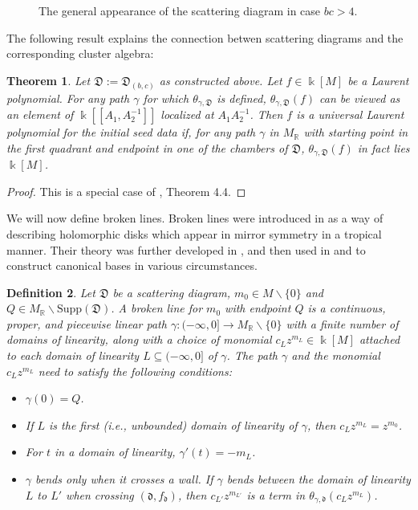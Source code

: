 \documentclass[12pt]{amsart}
\newtheorem{theorem}{Theorem}[section]
\newtheorem{defn}[theorem]{Definition}
\theoremstyle{remark}
\newcommand{\RR}{\mathbb{R}}
\newcommand{\dd}{\mathfrak{d}}
\newcommand{\DD}{\mathfrak{D}}
\begin{document}
\begin{figure}

\caption{The general appearance of the scattering diagram in case $bc>4$.}
\label{diagram33}
\end{figure}

The following result explains the connection betwen scattering diagrams
and the corresponding cluster algebra:

\begin{theorem}
\label{univLaurent}
Let $\DD:=\DD_{(b,c)}$ as constructed above.
Let $f \in \Bbbk[M]$ be a Laurent polynomial. For any path
$\gamma$ for which $\theta_{\gamma,\DD}$ is defined, $\theta_{\gamma,\DD}(f)$
can be viewed as an element of $\Bbbk[[A_1,A_2^{-1}]]$ localized at 
$A_1A_2^{-1}$. Then $f$ is a universal Laurent polynomial for the initial
seed data if, for any path $\gamma$ in $M_{\RR}$ with starting
point in the first quadrant and endpoint in one of the chambers of
$\DD$, $\theta_{\gamma,\DD}(f)$ in fact lies $\Bbbk[M]$.
\end{theorem}

\begin{proof}
This is a special case of \cite{GHKK}, Theorem 4.4.
\end{proof}

We will now define broken lines. Broken lines were introduced in 
\cite{G10} as a way of describing holomorphic disks which appear in
mirror symmetry in a tropical manner. Their theory was further developed
in \cite{CPS}, and then used in \cite{GHK11} and \cite{GHKK} to construct
canonical bases in various circumstances.

\begin{defn} \label{brokendef}
Let $\DD$ be a scattering diagram, $m_0 \in M \backslash \{0\}$ and $Q \in M_{\RR} \backslash \text{Supp}(\DD)$. A broken line for $m_0$ with endpoint $Q$ is a
continuous, proper, and  piecewise linear path $\gamma : ( - \infty , 0] 
\rightarrow M_{\mathbb{R}} \backslash \{ 0\} $ with a finite number of domains 
of linearity, along with a choice of
monomial $c_L z^{m_L} \in \Bbbk[M]$ attached to each domain of linearity $L \subseteq ( - \infty, 0]$ of $\gamma$. The path $\gamma$ and the monomial $c_L z^{m_L}$ need to satisfy the following conditions:
\begin{itemize}
    \item $\gamma(0) = Q$.
    \item If $L$ is the first (i.e., unbounded) domain of linearity of $\gamma$, then $c_L z^{m_L} = z^{m_0}$.
    \item For $t$ in a domain of linearity, $\gamma'(t) = -m_L$.
    \item $\gamma$ bends only when it crosses a wall. If $\gamma$ bends between the domain of linearity $L$ to $ L'$ when crossing $(\dd, f_{\dd})$, then $c_{L'}z^{m_{L'}}$ is a term in $\theta_{\gamma, \dd} (c_L z^{m_L})  $.
\end{itemize}
\end{defn}
\end{document}

